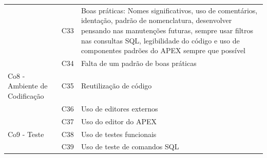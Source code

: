\begin{longtable}{|M{4.0cm} | M{1.3cm}| m{9.5cm}|}
                                                      & C33            & Boas práticas: Nomes significativos, uso de comentários, identação, padrão de nomenclatura, desenvolver pensando nas manutenções futuras, sempre usar filtros nas consultas SQL, legibilidade do código e uso de componentes padrões do APEX sempre que possível \\ 
                                                      & C34            & Falta de um padrão de boas práticas                                                                                                                                                                                                                              \\ \hline
Co8 - Ambiente de \newline Codificação        & C35            & Reutilização de código                                                                                                                                                                                                                                           \\ 
                                                      & C36            & Uso de editores externos                                                                                                                                                                                                                                         \\ 
                                                      & C37            & Uso do editor do APEX                                                                                                                                                                                                                                            \\ \hline
Co9 - Teste                          & C38            & Uso de testes funcionais                                                                                                                                                                                                                                         \\ 
                                                      & C39            & Uso de teste de comandos SQL                                                                                                                                                                                                                                     \\ 

\end{longtable}
